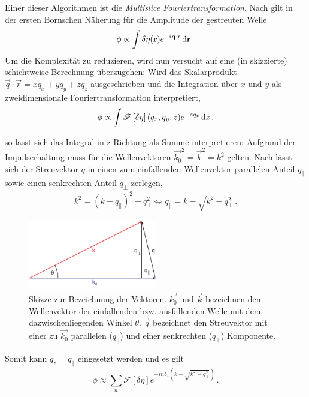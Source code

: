 Einer dieser Algorithmen ist die \textit{Multislice Fouriertransformation}. Nach  gilt in der ersten Bornschen Näherung für die Amplitude der gestreuten Welle
\begin{equation}
	\phi\propto\int \delta\eta(\vec{r}) e^{-i\vec{q}\cdot \vec{r}} \dif \vec{r} \, .
\end{equation}
Um die Komplexität zu reduzieren, wird nun versucht auf eine (in  skizzierte) schichtweise Berechnung überzugehen: Wird das Skalarprodukt $\vec{q}\cdot \vec{r}=xq_x+yq_y+zq_z$ ausgeschrieben und die Integration über $x$ und $y$ als zweidimensionale Fouriertransformation interpretiert,
\begin{equation}
	\phi\propto\int \mathscr{F}\left[\delta\eta\right](q_x,q_y,z) e^{-zq_z} \dif z \, ,
\end{equation}

so lässt sich das Integral in z-Richtung als Summe interpretieren:
Aufgrund der Impulserhaltung muss für die Wellenvektoren $\vec{k_0}^2=\vec{k}^2=k^2$ gelten. Nach   lässt sich der Streuvektor $q$ in einen zum einfallenden Wellenvektor parallelen Anteil $q_\parallel$ sowie einen senkrechten Anteil $q_\perp$ zerlegen,
\begin{align}
	k^2=(k-q_\parallel)^2+q_{\perp}^2                  
	\Leftrightarrow q_\parallel=k-\sqrt{k^2-q_\perp^2} \,.
\end{align}
\begin{figure}
	\centering
	\includegraphics[width=0.5\textwidth]{images/vec_msft.pdf}
	\caption[Vektoren bei MSFT]{Skizze zur Bezeichnung der Vektoren. $\vec{k_{0}}$ und $\vec{k}$ bezeichnen den Wellenvektor der einfallenden bzw. ausfallenden Welle mit dem dazwischenliegenden Winkel $\theta$. $\vec{q}$ bezeichnet den Streuvektor mit einer zu $\vec{k_{0}}$ parallelen ($q_{||}$) und einer senkrechten ($q_\perp$) Komponente.}
	\label{fig:vec_msft}
\end{figure} 

Somit kann $q_z=q_\parallel$ eingesetzt werden und es gilt 
\begin{equation}
	\label{eq:msft}
	\phi\approx\sum_n{\mathscr{F}\left[\delta\eta\right] e^{-in\delta_z\left(k-\sqrt{k^2-q_\perp^2}\right) }} \, .
\end{equation}



